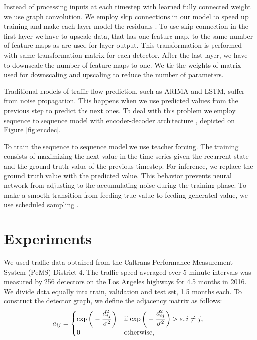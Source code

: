 \documentclass[letterpaper, 10 pt, conference]{ieeeconf}  %
\begin{document}
Instead of processing inputs at each timestep with learned fully connected weight we use graph convolution.  We employ skip connections in our model to speed up training and make each layer model the residuals \cite{Kim2017}. To use skip connection in the first layer we have to upscale data, that has one feature map, to the same number of feature maps as are used for layer output. This transformation is performed with same transformation matrix for each detector. After the last layer, we have to downscale the number of feature maps to one. We tie the weights of matrix used for downscaling and upscaling to reduce the number of parameters.

Traditional models of traffic flow prediction, such as ARIMA and LSTM, suffer from noise propagation. This happens when we use predicted values from the previous step to predict the next ones. To deal with this problem we employ sequence to sequence model with encoder-decoder architecture \cite{Cho2014}, depicted on Figure \ref{fig:encdec}.

To train the sequence to sequence model we use teacher forcing. The training consists of maximizing the next value in the time series given the recurrent state and the ground truth value of the previous timestep. For inference, we replace the ground truth value with the predicted value. This behavior prevents neural network from adjusting to the accumulating noise during the training phase. To make a smooth transition from feeding true value to feeding generated value, we use scheduled sampling \cite{Bengio2015}.

\section{Experiments}
We used traffic data obtained from the Caltrans Performance Measurement System (PeMS) \cite{pems} District 4. The traffic speed averaged over 5-minute intervals was measured by 256 detectors on the Los Angeles highways for 4.5 months in 2016.  We divide data equally into train, validation and test set, 1.5 months each. To construct the detector graph, we define the adjacency matrix as follows:
\begin{equation}
    a_{ij} =
    \begin{cases}
        \exp\bigg(-\dfrac{d_{ij}^2}{\sigma^2}\bigg) & \text{if $ \exp\bigg(-\dfrac{d_{ij}^2}{\sigma^2}\bigg) > \varepsilon , i \neq j$,} \\
        0 & \text{otherwise,}
    \end{cases}
\end{equation}
\end{document}
